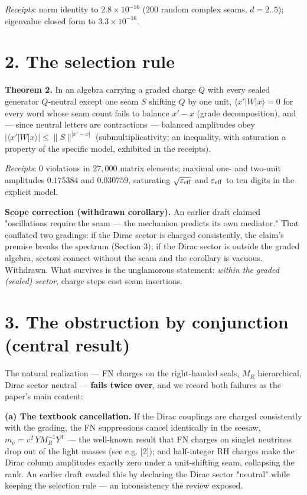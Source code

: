 \documentclass[11pt]{article}
\begin{document}
\emph{Receipts}: norm identity to $2.8\times 10^{-16}$ (200 random complex seams, $d = 2..5$); eigenvalue closed form to $3.3\times 10^{-16}$.

\section*{2. The selection rule}
\textbf{Theorem 2.}  In an algebra carrying a graded charge $Q$ with every sealed generator $Q$-neutral except one seam $S$ shifting $Q$ by one unit, $\langle x'|W|x\rangle = 0$ for every word whose seam count fails to balance $x' - x$ (grade decomposition), and — since neutral letters are contractions — balanced amplitudes obey $|\langle x'|W|x\rangle| \le \lVert S\rVert^{|x'-x|}$ (submultiplicativity; an inequality, with saturation a property of the specific model, exhibited in the receipts).

\emph{Receipts}: $0$ violations in $27{,}000$ matrix elements; maximal one- and two-unit amplitudes $0.175384$ and $0.030759$, saturating $\sqrt{\varepsilon_{\rm eff}}$ and $\varepsilon_{\rm eff}$ to ten digits in the explicit model.

\textbf{Scope correction (withdrawn corollary).}  An earlier draft claimed "oscillations require the seam — the mechanism predicts its own mediator."  That conflated two gradings: if the Dirac sector is charged consistently, the claim's premise breaks the spectrum (Section 3); if the Dirac sector is outside the graded algebra, sectors connect without the seam and the corollary is vacuous.  Withdrawn.  What survives is the unglamorous statement: \emph{within the graded (sealed) sector}, charge steps cost seam insertions.

\section*{3. The obstruction by conjunction (central result)}
The natural realization — FN charges on the right-handed seals, $M_R$ hierarchical, Dirac sector neutral — \textbf{fails twice over}, and we record both failures as the paper's main content:

\textbf{(a) The textbook cancellation.}  If the Dirac couplings are charged consistently with the grading, the FN suppressions cancel identically in the seesaw, $m_\nu = v^2\,Y M_R^{-1}Y^{\mathsf T}$ — the well-known result that FN charges on singlet neutrinos drop out of the light masses (see e.g. [2]); and half-integer RH charges make the Dirac column amplitudes exactly zero under a unit-shifting seam, collapsing the rank.  An earlier draft evaded this by declaring the Dirac sector "neutral" while keeping the selection rule — an inconsistency the review exposed.
\end{document}
